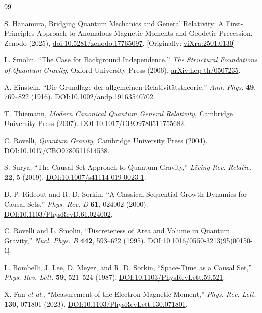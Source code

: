 \documentclass[%
 reprint,
 amsmath,amssymb,
 aps,
]{revtex4-1}
\numberwithin{equation}{section}%
\begin{document}
\begin{thebibliography}{99}

S. Hanamura, Bridging Quantum Mechanics and General Relativity: A First-Principles Approach to Anomalous Magnetic Moments and Geodetic Precession, Zenodo (2025), \href{https://doi.org/10.5281/zenodo.17765097}{doi:10.5281/zenodo.17765097}. [Originally: \href{https://vixra.org/abs/2501.0130}{viXra:2501.0130}]

L. Smolin,
``The Case for Background Independence,''
\textit{The Structural Foundations of Quantum Gravity}, Oxford University Press (2006).
\href{https://arxiv.org/abs/hep-th/0507235}{arXiv:hep-th/0507235}.

A. Einstein,
``Die Grundlage der allgemeinen Relativit\"atstheorie,''
\textit{Ann. Phys.} \textbf{49}, 769--822 (1916).
\href{https://doi.org/10.1002/andp.19163540702}{DOI:10.1002/andp.19163540702}.

T. Thiemann,
\textit{Modern Canonical Quantum General Relativity},
Cambridge University Press (2007).
\href{https://doi.org/10.1017/CBO9780511755682}{DOI:10.1017/CBO9780511755682}.

C. Rovelli,
\textit{Quantum Gravity},
Cambridge University Press (2004).
\href{https://doi.org/10.1017/CBO9780511614538}{DOI:10.1017/CBO9780511614538}.

S. Surya,
``The Causal Set Approach to Quantum Gravity,''
\textit{Living Rev. Relativ.} \textbf{22}, 5 (2019).
\href{https://doi.org/10.1007/s41114-019-0023-1}{DOI:10.1007/s41114-019-0023-1}.

D. P. Rideout and R. D. Sorkin,
``A Classical Sequential Growth Dynamics for Causal Sets,''
\textit{Phys. Rev. D} \textbf{61}, 024002 (2000).
\href{https://doi.org/10.1103/PhysRevD.61.024002}{DOI:10.1103/PhysRevD.61.024002}.

C. Rovelli and L. Smolin,
``Discreteness of Area and Volume in Quantum Gravity,''
\textit{Nucl. Phys. B} \textbf{442}, 593--622 (1995).
\href{https://doi.org/10.1016/0550-3213(95)00150-Q}{DOI:10.1016/0550-3213(95)00150-Q}.

L. Bombelli, J. Lee, D. Meyer, and R. D. Sorkin,
``Space-Time as a Causal Set,''
\textit{Phys. Rev. Lett.} \textbf{59}, 521--524 (1987).
\href{https://doi.org/10.1103/PhysRevLett.59.521}{DOI:10.1103/PhysRevLett.59.521}.

X. Fan \textit{et al.},
``Measurement of the Electron Magnetic Moment,''
\textit{Phys. Rev. Lett.} \textbf{130}, 071801 (2023).
\href{https://doi.org/10.1103/PhysRevLett.130.071801}{DOI:10.1103/PhysRevLett.130.071801}.


\end{thebibliography}
\end{document}

